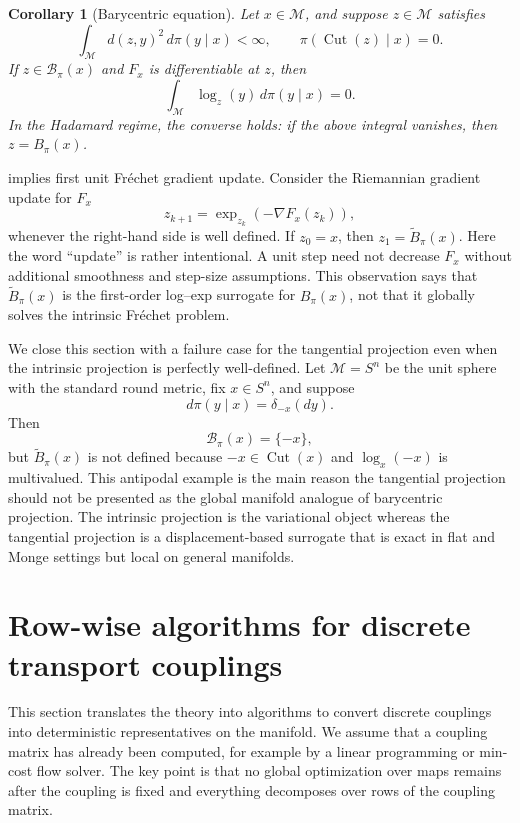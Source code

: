 \documentclass[10pt]{article} %
\newtheorem{corollary}[corollary]{Corollary}
\theoremstyle{definition}
\providecommand{\1}{\mathbf{1}}
\providecommand{\sM}{\mathcal{M}}
\providecommand{\Frechet}{Fr\'{e}chet\xspace}
\DeclareMathOperator{\Cut}{Cut}
\begin{document}
\begin{corollary}[Barycentric equation]
\label{cor:barycentric_equation}
Let $x\in\sM$, and suppose $z\in\sM$ satisfies
\[
\int_{\sM} d(z,y)^2\,d\pi(y\mid x)<\infty,
\qquad
\pi(\Cut(z)\mid x)=0.
\]
If $z\in\mathcal B_\pi(x)$ and $F_x$ is differentiable at $z$, then
\[
\int_{\sM}\log_z(y)\,d\pi(y\mid x)=0.
\]
In the Hadamard regime, the converse holds: if the above integral vanishes, then $z=B_\pi(x)$.
\end{corollary}
 implies first unit \Frechet gradient update. Consider the Riemannian gradient update for $F_x$
\[
z_{k+1}=\exp_{z_k}(-\nabla F_x(z_k)),
\]
whenever the right-hand side is well defined. If $z_0=x$, then
$
z_1=\widetilde B_\pi(x)
$. Here the word ``update'' is rather intentional. A unit step need not decrease \(F_x\) without additional smoothness and step-size assumptions. This observation says that $\widetilde B_\pi(x)$ is the first-order log--exp surrogate for $B_\pi(x)$, not that it globally solves the intrinsic Fr\'echet problem.



We close this section with a failure case for the tangential projection even when the intrinsic projection is perfectly well-defined. Let $\sM=S^n$ be the unit sphere with the standard round metric, fix $x\in S^n$, and suppose
\[
d\pi(y\mid x)=\delta_{-x}(dy).
\]
Then
\[
\mathcal B_\pi(x)=\{-x\},
\]
but $\widetilde B_\pi(x)$ is not defined because $-x\in\Cut(x)$ and $\log_x(-x)$ is multivalued. This antipodal example is the main reason the tangential projection should not be presented as the global manifold analogue of barycentric projection. The intrinsic projection is the variational object whereas the tangential projection is a displacement-based surrogate that is exact in flat and Monge settings but local on general manifolds.













\section{Row-wise algorithms for discrete transport couplings}
\label{sec:algorithms}

This section translates the theory into algorithms to convert discrete couplings into deterministic representatives on the manifold. We assume that a coupling matrix has already been computed, for example by a linear programming or min-cost flow solver. The key point is that no global optimization over maps remains after the coupling is fixed and everything decomposes over rows of the coupling matrix.
\end{document}
